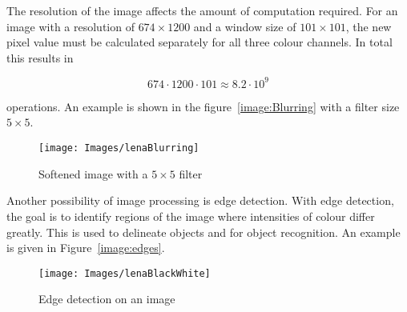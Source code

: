 The resolution of the image affects the amount of computation required. For an image with a resolution of $674 \times 1200$ and a window size of $101 \times 101$, the new pixel value must be calculated separately for all three colour channels. In total this results in

$$674 \cdot 1200 \cdot 101 \approx 8.2 \cdot 10^9$$

operations. An example is shown in the figure~\ref{image:Blurring} with a filter size $5 \times 5$.


\begin{figure}
  \centering
  
  \texttt{[image: Images/lenaBlurring]}

  \caption{Softened image with a $5 \times 5$ filter}\label{Bild:Blurring}
\end{figure}


Another possibility of image processing is edge detection. With edge detection, the goal is to identify regions of the image where intensities of colour differ greatly. This is used to delineate objects and for object recognition. An example is given in Figure~\ref{image:edges}.

%
%

\begin{figure}
	\centering
	
	\texttt{[image: Images/lenaBlackWhite]}
	
	\caption{Edge detection on an image}\label{Bild:Kanten}
\end{figure}





%                
%        
%        
%        

